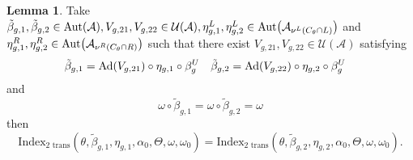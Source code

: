 \documentclass[12pt,a4paper,twoside]{article}
\let\originalleft\left
\let\originalright\right
\renewcommand{\left}{\mathopen{}\mathclose\bgroup\originalleft}
\renewcommand{\right}{\aftergroup\egroup\originalright}
\newcommand{\UU}{\mathcal U}
\renewcommand{\AA}{\mathcal A}
\newcommand{\Ad}[1]{\textrm{Ad}\left(#1\right)}
\newcommand{\Aut}[1]{\textrm{Aut}\left(#1\right)}
\theoremstyle{definition}
\newtheorem{lemma}[theorem]{Lemma}
\numberwithin{equation}{section}
\begin{document}
\begin{lemma}\label{lem:InvarianceUnderChoiceBetaTwoTranslations}
	Take $\tilde{\beta}_{g,1},\tilde{\beta}_{g,2}\in\Aut{\AA},V_{g,21},V_{g,22}\in\UU(\AA),\eta_{g,1}^L,\eta_{g,2}^L\in \Aut{\AA_{\nu^{L}(C_\theta\cap L)}}$ and $\eta_{g,1}^R,\eta_{g,2}^R\in \Aut{\AA_{\nu^{R}(C_\theta\cap R)}}$ such that there exist $V_{g,21},V_{g,22}\in\UU(\AA)$ satisfying
	\begin{align}\label{eq:InvarianceUnderChoiceBetaTwoBetasTwoTranslations}
		\tilde{\beta}_{g,1}&=\Ad{V_{g,21}}\circ\eta_{g,1}\circ\beta^U_g&\tilde{\beta}_{g,2}&=\Ad{V_{g,22}}\circ\eta_{g,2}\circ\beta^U_g
	\end{align}
	and
	\begin{equation}
		\omega\circ\tilde{\beta}_{g,1}=\omega\circ\tilde{\beta}_{g,2}=\omega
	\end{equation}
	then
	\begin{equation}
		\textrm{Index}_{\text{2 trans}}(\theta,\tilde{\beta}_{g,1},\eta_{g,1},\alpha_{0},\Theta,\omega,\omega_0)=\textrm{Index}_{\text{2 trans}}(\theta,\tilde{\beta}_{g,2},\eta_{g,2},\alpha_{0},\Theta,\omega,\omega_0).
	\end{equation}
\end{lemma}
\end{document}

